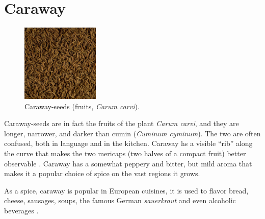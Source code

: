 
\section{Caraway}
\label{sec:caraway}




\begin{figure}
	\vspace{-\baselineskip}
	\includegraphics[width=0.33\textwidth]{imgs/spices/caraway-1.jpg}
	\caption{Caraway-seeds (fruits, \textit{Carum carvi}).}
	\label{fig:caraway}
\end{figure}

Caraway-seeds are in fact the fruits of the plant \textit{Carum carvi}, and they are longer, narrower, and darker than cumin (\textit{Cuminum cyminum}). The two are often confused, both in language and in the kitchen. Caraway hs a visible ``rib'' along the curve that makes the two mericaps (two halves of a compact fruit) better observable \autocite[100]{van_wyk_culinary_2014}. Caraway has a somewhat peppery and bitter, but mild aroma that makes it a popular choice of spice on the vast regions it grows. 

As a spice, caraway is popular in European cuisines, it is used to flavor bread, cheese, sausages, soups, the famous German \textit{sauerkraut} and even alcoholic beverages \autocite{van_wyk_culinary_2014}.




